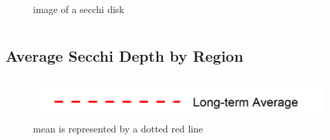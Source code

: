 \documentclass[
]{book}
\begin{document}
\begin{columns-nocenter}
\begin{column}
\begin{figure}
{}

\caption{image of a secchi disk}\label{fig:unnamed-chunk-49}
\end{figure}

\end{column}

\end{columns-nocenter}

\hypertarget{average-secchi-depth-by-region}{%
\subsection{Average Secchi Depth by Region}\label{average-secchi-depth-by-region}}

\begin{columns-nocenter}

\begin{column}

\begin{figure}
\includegraphics[width=15.25in]{figures/mline} \caption{mean is represented by a dotted red line}\label{fig:unnamed-chunk-50}
\end{figure}

\end{column}

\begin{column}

\end{column}

\begin{column}

\end{column}

\end{columns-nocenter}
\end{document}
